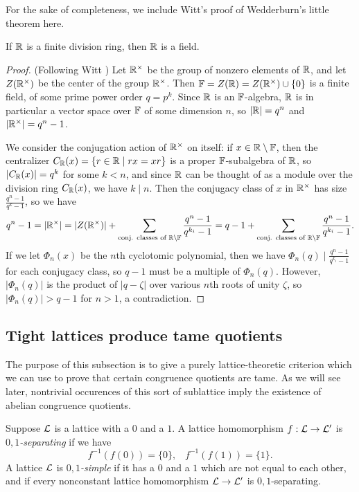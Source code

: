 \begin{appendices}
For the sake of completeness, we include Witt's proof of Wedderburn's little theorem here.

\begin{thm}\label{thm-wedderburn-little} If $\mathbb{R}$ is a finite division ring, then $\mathbb{R}$ is a field.
\end{thm}
\begin{proof} (Following Witt \cite{witt-wedderburn-little}) Let $\mathbb{R}^\times$ be the group of nonzero elements of $\mathbb{R}$, and let $Z(\mathbb{R}^\times)$ be the center of the group $\mathbb{R}^\times$. Then $\mathbb{F} = Z(\mathbb{R}) = Z(\mathbb{R}^\times) \cup \{0\}$ is a finite field, of some prime power order $q = p^k$. Since $\mathbb{R}$ is an $\mathbb{F}$-algebra, $\mathbb{R}$ is in particular a vector space over $\mathbb{F}$ of some dimension $n$, so $|\mathbb{R}| = q^n$ and $|\mathbb{R}^\times| = q^n-1$.

We consider the conjugation action of $\mathbb{R}^\times$ on itself: if $x \in \mathbb{R} \setminus \mathbb{F}$, then the centralizer $C_{\mathbb{R}}(x) = \{r \in \mathbb{R} \mid rx = xr\}$ is a proper $\mathbb{F}$-subalgebra of $\mathbb{R}$, so $|C_{\mathbb{R}}(x)| = q^k$ for some $k < n$, and since $\mathbb{R}$ can be thought of as a module over the division ring $C_{\mathbb{R}}(x)$, we have $k \mid n$. Then the conjugacy class of $x$ in $\mathbb{R}^\times$ has size $\frac{q^n-1}{q^k-1}$, so we have
\[
q^n-1 = |\mathbb{R}^\times| = |Z(\mathbb{R}^\times)| + \sum_{\text{conj. classes of }\mathbb{R}\setminus\mathbb{F}} \frac{q^n-1}{q^{k_i}-1} = q-1 + \sum_{\text{conj. classes of }\mathbb{R}\setminus\mathbb{F}} \frac{q^n-1}{q^{k_i}-1}.
\]
If we let $\Phi_n(x)$ be the $n$th cyclotomic polynomial, then we have $\Phi_n(q) \mid \frac{q^n-1}{q^{k_i}-1}$ for each conjugacy class, so $q-1$ must be a multiple of $\Phi_n(q)$. However, $|\Phi_n(q)|$ is the product of $|q-\zeta|$ over various $n$th roots of unity $\zeta$, so $|\Phi_n(q)| > q-1$ for $n > 1$, a contradiction.
\end{proof}


\subsection{Tight lattices produce tame quotients}

The purpose of this subsection is to give a purely lattice-theoretic criterion which we can use to prove that certain congruence quotients are tame. As we will see later, nontrivial occurences of this sort of sublattice imply the existence of abelian congruence quotients.

\begin{defn} Suppose $\mathcal{L}$ is a lattice with a $0$ and a $1$. A lattice homomorphism $f : \mathcal{L} \rightarrow \mathcal{L}'$ is \emph{$0,1$-separating} if we have
\[
f^{-1}(f(0)) = \{0\}, \;\;\; f^{-1}(f(1)) = \{1\}.
\]
A lattice $\mathcal{L}$ is \emph{$0,1$-simple} if it has a $0$ and a $1$ which are not equal to each other, and if every nonconstant lattice homomorphism $\mathcal{L} \rightarrow \mathcal{L}'$ is $0,1$-separating.


\end{defn}
\end{appendices}
